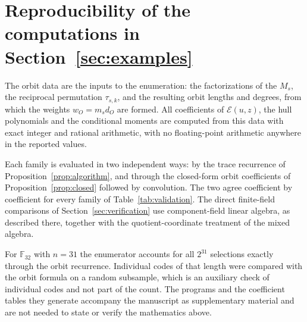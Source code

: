 \documentclass[10pt,a4paper]{article}
\newcommand{\F}{\mathbb F}
\newcommand{\Epoly}{\mathscr E}
\numberwithin{equation}{section}
\theoremstyle{plain}
\theoremstyle{definition}
\theoremstyle{remark}
\begin{document}
\appendix
\section{Reproducibility of the computations in Section~\ref{sec:examples}}\label{app:repro}

The orbit data are the inputs to the enumeration: the factorizations of the
$M_s$, the reciprocal permutation $\tau_{s,k}$, and the resulting orbit lengths
and degrees, from which the weights $w_O=m_sd_O$ are formed. All coefficients of
$\Epoly(u,z)$, the hull polynomials and the conditional moments are computed from
this data with exact integer and rational arithmetic, with no floating-point
arithmetic anywhere in the reported values.

Each family is evaluated in two independent ways: by the trace recurrence of
Proposition~\ref{prop:algorithm}, and through the closed-form orbit coefficients
of Proposition~\ref{prop:closed} followed by convolution. The two agree
coefficient by coefficient for every family of Table~\ref{tab:validation}. The
direct finite-field comparisons of Section~\ref{sec:verification} use
component-field linear algebra, as described there, together with the
quotient-coordinate treatment of the mixed algebra.

For $\F_{32}$ with $n=31$ the enumerator accounts for all $2^{31}$ selections
exactly through the orbit recurrence. Individual codes of that length were
compared with the orbit formula on a random subsample, which is an auxiliary
check of individual codes and not part of the count. The programs and the
coefficient tables they generate accompany the manuscript as supplementary
material and are not needed to state or verify the mathematics above.



\end{document}
